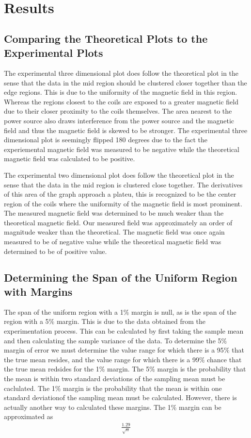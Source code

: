 \documentclass[a4paper]{article}
\begin{document}
\section{Results}
\subsection{Comparing the Theoretical Plots to the Experimental Plots}
The experimental three dimensional plot does follow the theoretical
plot in the sense that the data in the mid region should be clustered
closer together than the edge regions. This is due to the uniformity
of the magnetic field in this region. Whereas the regions closest to
the coils are exposed to a greater magnetic field due to their closer
proximity to the coils themselves. The area nearest to the power
source also draws interference from the power source and the magnetic
field and thus the magnetic field is skewed to be stronger. The
experimental three dimensional plot is seemingly flipped 180 degrees
due to the fact the experiemental magnetic field was measured to be
negative while the theoretical magnetic field was calculated to be
positive.

The experimental two dimensional plot does follow the theoretical plot
in the sense that the data in the mid region is clustered close
together. The derivatives of this area of the graph approach a
plateu, this is recognized to be the center region of the coils where
the uniformity of the magnetic field is most prominent. The measured
magnetic field was determined to be much weaker than the theoretical
magnetic field. Our measured field was approximately an order of
magnitude weaker than the theoretical. The magnetic field was once
again measured to be of negative value while the theoretical magnetic
field was determined to be of positive value.

\subsection{Determining the Span of the Uniform Region with Margins}
\qq The span of the uniform region with a 1$\%$ margin is null, as is
the span of the region with a 5$\%$ margin. This is due to the data
obtained from the experimentation process. This can be calculated by
first taking the sample mean and then calculating the sample variance
of the data. To determine the 5$\%$ margin of error we must determine
the value range for which there is a 95$\%$ that the true mean
resides, and the value range for which there is a 99$\%$ chance that
the true mean redsides for the 1$\%$ margin. The 5$\%$ margin is the
probability that the mean is within two standard deviations of the
sampling mean must be caclulated. The 1$\%$ margin is the probability
that the mean is within one standard deviationof the sampling mean
must be calculated. However, there is actually another way to
calculated these margins. The 1$\%$ margin can be approximated as
\begin{align}
\frac{1.29}{\sqrt{n}}
\end{align}
\end{document}
